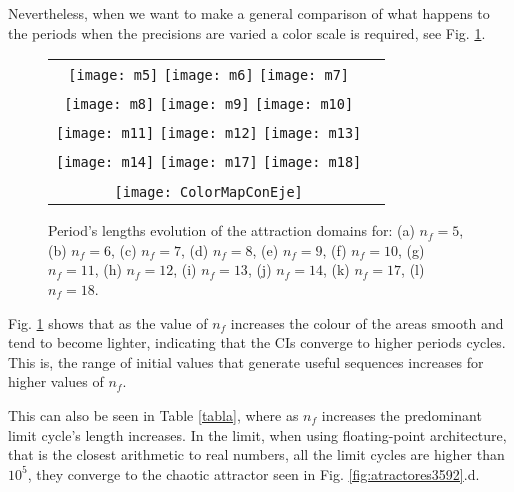 Nevertheless, when we want to make a general comparison of what happens to the periods when the precisions are varied a color scale is required, see Fig. \ref{fig:m}.
\begin{figure}
\centering
\begin{tabular}{cc}
\texttt{[image: m5]}
\texttt{[image: m6]}
\texttt{[image: m7]}\\
\texttt{[image: m8]}
\texttt{[image: m9]}
\texttt{[image: m10]}\\
\texttt{[image: m11]}
\texttt{[image: m12]}
\texttt{[image: m13]}\\
\texttt{[image: m14]}
\texttt{[image: m17]}
\texttt{[image: m18]}\\
\\   
\texttt{[image: ColorMapConEje]}
\end{tabular}
\caption{Period's lengths evolution of the attraction domains for: (a) $n_f=5$, (b) $n_f=6$, (c) $n_f=7$, (d) $n_f=8$, (e) $n_f=9$, (f) $n_f=10$, (g) $n_f=11$, (h) $n_f=12$, (i) $n_f=13$, (j) $n_f=14$, (k) $n_f=17$, (l) $n_f=18$.}
\label{fig:m}
\end{figure}

Fig. \ref{fig:m} shows that as the value of $n_f$ increases the colour of the areas smooth and tend to become lighter, indicating that the CIs converge to
higher periods cycles. This is, the range of initial values
that generate useful sequences increases for higher values of $n_f$.

This can also be seen in Table \ref{tabla}, where as $n_f$ increases the predominant limit cycle's length increases. In the limit, when using floating-point architecture, that is the closest arithmetic to real numbers, all the limit cycles are higher than $10^5$, they converge to the chaotic attractor seen in Fig. \ref{fig:atractores3592}.d.

